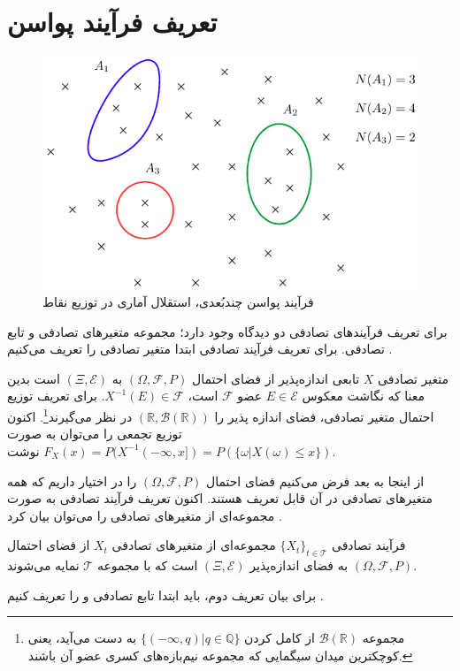 \section{تعریف فرآیند پواسن}
\begin{figure}
\center
\includegraphics{images/poiss-process}
\caption{فرآیند پواسن چند‌بُعدی، استقلال آماری در توزیع نقاط}
\label{fig:ndpp}
\end{figure}
برای تعریف فرآیندهای تصادفی دو دیدگاه وجود دارد؛ مجموعه متغیرهای تصادفی و تابع تصادفی. برای تعریف فرآیند تصادفی ابتدا متغیر تصادفی را تعریف می‌کنیم \cite{williams1991probability}.
\begin{definition}%
متغیر تصادفی $X$ تابعی اندازه‌پذیر از فضای احتمال $(\Omega,\mathcal{F},P)$ به  
 $(\Xi,\mathcal{E})$
 است‌ بدین معنا که نگاشت معکوس $E\in\mathcal{E}$ عضو $\mathcal{F}$ است، $X^{-1}(E) \in \mathcal{F}$. برای تعریف توزیع احتمال متغیر تصادفی، فضای اندازه پذیر را $(\mathbb{R}, \mathcal{B}(\mathbb{R}))$ در نظر می‌گیرند\footnote{
مجموعه  $\mathcal{B}(\mathbb{R})$ از کامل کردن  $\{(-\infty,q)|q\in\mathbb{Q}\}$ به دست می‌آید، یعنی کوچکترین میدان سیگمایی که مجموعه   نیم‌باز‌ه‌های کسری عضو آن باشند.
}.
 اکنون توزیع تجمعی را می‌توان به صورت 
$F_X(x)=P(X^{-1}(-\infty,x])=P(\{\omega|X(\omega)\leq x\})$
 نوشت.
\end{definition}
از اینجا به بعد فرض می‌کنیم  فضای احتمال $(\Omega,\mathcal{F},P)$  را در اختیار داریم که همه متغیرهای تصادفی در آن قابل تعریف هستند.  اکنون تعریف فرآیند تصادفی به صورت مجموعه‌ای از متغیرهای تصادفی را می‌توان بیان کرد \cite{shalizialmost}.
\begin{definition}%
فرآیند تصادفی  $\{X_t\}_{t\in \mathcal{T}}$ مجموعه‌ای از متغیرهای تصادفی $X_t$ از فضای احتمال $(\Omega,\mathcal{F},P)$  به فضای اندازه‌پذیر $(\Xi,\mathcal{E})$ است‌ که با مجموعه‌ $\mathcal{T}$ نمایه می‌شوند.	
\end{definition}
برای بیان تعریف دوم، باید ابتدا تابع تصادفی و 
 را تعریف ‌کنیم \cite{shalizialmost}.

